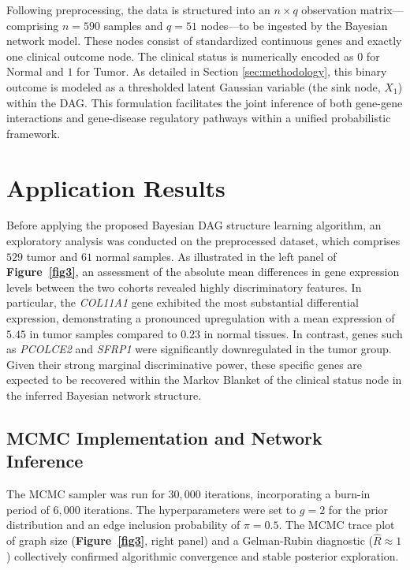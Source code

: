 \documentclass[twoside]{article}
\begin{document}
Following preprocessing, the data is structured into an $n \times q$ observation matrix—comprising $n=590$ samples and $q=51$ nodes—to be ingested by the Bayesian network model. These nodes consist of standardized continuous genes and exactly one clinical outcome node. 
The clinical status is numerically encoded as $0$ for Normal and $1$ for Tumor. As detailed in Section \ref{sec:methodology}, this binary outcome is modeled as a thresholded latent Gaussian variable (the sink node, $X_1$) within the DAG. This formulation facilitates the joint inference of both gene-gene interactions and gene-disease regulatory pathways within a unified probabilistic framework.
\vspace{-0.5cm}\section{Application Results}
\label{sec:application}
Before applying the proposed Bayesian DAG structure learning algorithm, an exploratory analysis was conducted on the preprocessed dataset, which comprises $529$ tumor and $61$ normal samples. As illustrated in the left panel of \textbf{Figure~\ref{fig3}}, an assessment of the absolute mean differences in gene expression levels between the two cohorts revealed highly discriminatory features. In particular, the \textit{COL11A1} gene exhibited the most substantial differential expression, demonstrating a pronounced upregulation with a mean expression of $5.45$ in tumor samples compared to $0.23$ in normal tissues. In contrast, genes such as \textit{PCOLCE2} and \textit{SFRP1} were significantly downregulated in the tumor group. Given their strong marginal discriminative power, these specific genes are expected to be recovered within the Markov Blanket of the clinical status node in the inferred Bayesian network structure.
\vspace{-0.4cm}
\subsection{MCMC Implementation and Network Inference}
The MCMC sampler was run for $30,000$ iterations, incorporating a burn-in period of $6,000$ iterations. The hyperparameters were set to $g = 2$ for the prior distribution and an edge inclusion probability of $\pi = 0.5$. 
The MCMC trace plot of graph size (\textbf{Figure~\ref{fig3}}, right panel) and a Gelman-Rubin diagnostic ($\hat{R} \approx 1$) collectively confirmed algorithmic convergence and stable posterior exploration.
\end{document}
